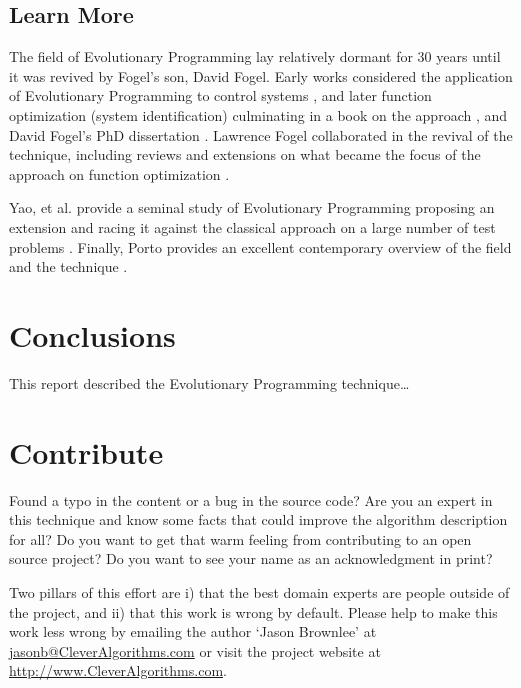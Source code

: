 \documentclass[a4paper, 11pt]{article}
\makeatletter
\newcommand{\myreportauthor}{Jason Brownlee}
\newcommand{\myreportemail}{jasonb@CleverAlgorithms.com}
\newcommand{\myreportwebsite}{http://www.CleverAlgorithms.com}
\makeatother
\begin{document}
% 
% 
\subsection{Learn More}
The field of Evolutionary Programming lay relatively dormant for 30 years until it was revived by Fogel's son, David Fogel. Early works considered the application of Evolutionary Programming to control systems \cite{Sebald1990}, and later function optimization (system identification) culminating in a book on the approach \cite{Fogel1991}, and David Fogel's PhD dissertation \cite{Fogel1992}.
Lawrence Fogel collaborated in the revival of the technique, including reviews \cite{Fogel1990, Fogel1994} and extensions on what became the focus of the approach on function optimization \cite{Fogel1991a}.

Yao, et al. provide a seminal study of Evolutionary Programming proposing an extension and racing it against the classical approach on a large number of test problems \cite{Yao1999}. Finally, Porto provides an excellent contemporary overview of the field and the technique \cite{Porto2000}.

% 
% 
\section{Conclusions}
\label{sec:conclusions}
This report described the Evolutionary Programming technique\ldots


% 
% 
\section{Contribute}
\label{sec:contribute}
Found a typo in the content or a bug in the source code? 
Are you an expert in this technique and know some facts that could improve the algorithm description for all?
Do you want to get that warm feeling from contributing to an open source project? 
Do you want to see your name as an acknowledgment in print?

Two pillars of this effort are i) that the best domain experts are people outside of the project, and ii) that this work is wrong by default. 
Please help to make this work less wrong by emailing the author `\myreportauthor' at \url{\myreportemail} or visit the project website at \url{\myreportwebsite}.



\end{document}
